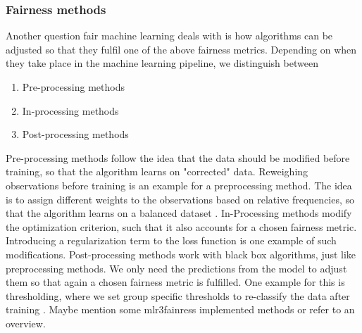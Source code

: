 \subsubsection*{Fairness methods}
Another question fair machine learning deals with is how algorithms can be adjusted so that they fulfil one of the above fairness metrics.
Depending on when they take place in the machine learning pipeline, we distinguish between
\begin{enumerate}
    \item Pre-processing methods
    \item In-processing methods
    \item Post-processing methods
\end{enumerate}
Pre-processing methods follow the idea that the data should be modified before training, so that the algorithm learns on "corrected" data. Reweighing observations before training is an example for a preprocessing method. The idea is to assign different weights to the observations based on relative frequencies, so that the algorithm learns on a balanced dataset \cite{caton2024}.
In-Processing methods modify the optimization criterion, such that it also accounts for a chosen fairness metric. Introducing a regularization term to the loss function is one example of such modifications.
Post-processing methods work with black box algorithms, just like preprocessing methods. We only need the predictions from the model to adjust them so that again a chosen fairness metric is fulfilled. One example for this is thresholding, where we set group specific thresholds to re-classify the data after training \cite{hardt2016}. Maybe mention some mlr3fainress implemented methods or refer to an overview.

